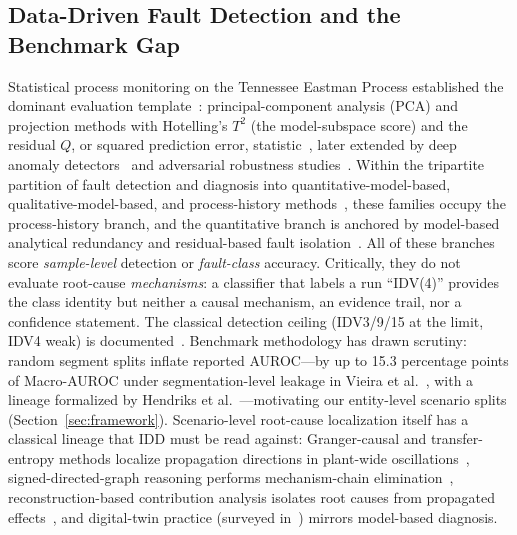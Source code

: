 \documentclass[preprint,10pt]{elsarticle}
\begin{document}
\subsection{Data-Driven Fault Detection and the Benchmark Gap}
Statistical process monitoring on the Tennessee Eastman Process established the dominant evaluation template~\cite{downs1993plant,qin2012survey}: principal-component analysis (PCA) and projection methods with Hotelling's $T^2$ (the model-subspace score) and the residual $Q$, or squared prediction error, statistic~\cite{kano2002comparison,yin2014review}, later extended by deep anomaly detectors~\cite{hartung2023deep,tuli2022tranad} and adversarial robustness studies~\cite{pozdnyakov2024adversarial}. Within the tripartite partition of fault detection and diagnosis into quantitative-model-based, qualitative-model-based, and process-history methods~\cite{venkatasubramanian2003review,venkatasubramanian2003part2,venkatasubramanian2003part3}, these families occupy the process-history branch, and the quantitative branch is anchored by model-based analytical redundancy and residual-based fault isolation~\cite{isermann2005model}. All of these branches score \emph{sample-level} detection or \emph{fault-class} accuracy. Critically, they do not evaluate root-cause \emph{mechanisms}: a classifier that labels a run ``IDV(4)'' provides the class identity but neither a causal mechanism, an evidence trail, nor a confidence statement. The classical detection ceiling (IDV3/9/15 at the limit, IDV4 weak) is documented~\cite{russell2000delay,chiang2001fault}. Benchmark methodology has drawn scrutiny: random segment splits inflate reported AUROC---by up to 15.3 percentage points of Macro-AUROC under segmentation-level leakage in Vieira et al.~\cite{vieira2026towards}, with a lineage formalized by Hendriks et al.~\cite{hendriks2022towards}---motivating our entity-level scenario splits (Section~\ref{sec:framework}). Scenario-level root-cause localization itself has a classical lineage that IDD must be read against: Granger-causal and transfer-entropy methods localize propagation directions in plant-wide oscillations~\cite{yuan2014root,bauer2007finding,yoon2001statistical,thornhill2007fault}, signed-directed-graph reasoning performs mechanism-chain elimination~\cite{iri1979algorithm}, reconstruction-based contribution analysis isolates root causes from propagated effects~\cite{dunia1996identification,alcala2009reconstruction}, and digital-twin practice (surveyed in~\cite{tao2019digital}) mirrors model-based diagnosis.
\end{document}
